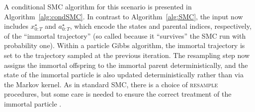 A conditional SMC algorithm for this scenario is presented in Algorithm~\ref{alg:condSMC}.
In contrast to Algorithm~\ref{alg:SMC}, the input now includes $x_{0:T}^\star$ and $a_{0:T}^\star$, which encode the states and parental indices, respectively, of the ``immortal trajectory'' (so called because it ``survives'' the SMC run with probability one). Within a particle Gibbs algorithm, the immortal trajectory is set to the trajectory sampled at the previous iteration.
The resampling step now assigns the immortal offspring to the immortal parent deterministically, and the state of the immortal particle is also updated deterministically rather than via the Markov kernel.
As in standard SMC, there is a choice of \textsc{resample} procedures, but some care is needed to ensure the correct treatment of the immortal particle \parencite{lee2019}.
